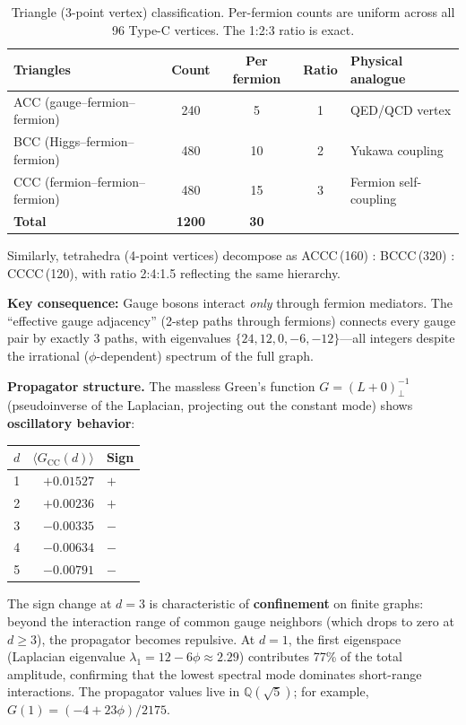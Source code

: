 \documentclass[12pt,a4paper]{article}
\begin{document}
\begin{table}[H]
\centering
\begin{tabular}{lcccl}
\toprule
\textbf{Triangles} & \textbf{Count} & \textbf{Per fermion} & \textbf{Ratio} & \textbf{Physical analogue} \\
\midrule
ACC (gauge--fermion--fermion) & 240 & 5 & 1 & QED/QCD vertex \\
BCC (Higgs--fermion--fermion) & 480 & 10 & 2 & Yukawa coupling \\
CCC (fermion--fermion--fermion) & 480 & 15 & 3 & Fermion self-coupling \\
\midrule
\textbf{Total} & \textbf{1200} & \textbf{30} & & \\
\bottomrule
\end{tabular}
\caption{Triangle (3-point vertex) classification. Per-fermion counts are uniform across all 96 Type-C vertices. The 1:2:3 ratio is exact.}
\end{table}

Similarly, tetrahedra (4-point vertices) decompose as ACCC\,(160) : BCCC\,(320) : CCCC\,(120), with ratio 2:4:1.5 reflecting the same hierarchy.

\textbf{Key consequence:} Gauge bosons interact \emph{only} through fermion mediators. The ``effective gauge adjacency'' (2-step paths through fermions) connects every gauge pair by exactly 3 paths, with eigenvalues $\{24, 12, 0, -6, -12\}$---all integers despite the irrational ($\phi$-dependent) spectrum of the full graph.

\textbf{Propagator structure.} The massless Green's function $G = (L + 0)^{-1}_{\perp}$ (pseudoinverse of the Laplacian, projecting out the constant mode) shows \textbf{oscillatory behavior}:

\begin{center}
\begin{tabular}{crl}
$d$ & $\langle G_{\text{CC}}(d)\rangle$ & Sign \\
\hline
1 & $+0.01527$ & $+$ \\
2 & $+0.00236$ & $+$ \\
3 & $-0.00335$ & $-$ \\
4 & $-0.00634$ & $-$ \\
5 & $-0.00791$ & $-$ \\
\end{tabular}
\end{center}

The sign change at $d = 3$ is characteristic of \textbf{confinement} on finite graphs: beyond the interaction range of common gauge neighbors (which drops to zero at $d \geq 3$), the propagator becomes repulsive. At $d = 1$, the first eigenspace (Laplacian eigenvalue $\lambda_1 = 12 - 6\phi \approx 2.29$) contributes 77\% of the total amplitude, confirming that the lowest spectral mode dominates short-range interactions. The propagator values live in $\mathbb{Q}(\sqrt{5})$; for example, $G(1) = (-4 + 23\phi)/2175$.
\end{document}
